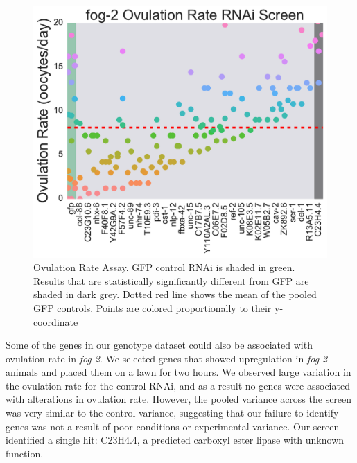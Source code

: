 \documentclass[10pt,letterpaper,twocolumn]{article}
\newcommand{\fog}{\emph{fog-2}}
\begin{document}
\begin{figure}
\renewcommand{\familydefault}{\sfdefault}\normalfont{}
\centering
\includegraphics[width=\linewidth]{../output/figs/final_figs/oocyte_rate_assay.pdf}
\caption{Ovulation Rate Assay. GFP control RNAi is shaded in green. Results that are statistically significantly different from GFP are shaded in dark grey. Dotted red line shows the mean of the pooled GFP controls. Points are colored proportionally to their y-coordinate
}%
\label{fig:oocytedropping}
\end{figure}

Some of the genes in our genotype dataset could also be associated with ovulation rate in \fog{}. We selected genes that showed upregulation in \fog{} animals and placed them on a lawn for two hours. We observed large variation in the ovulation rate for the control RNAi, and as a result no genes were associated with alterations in ovulation rate. However, the pooled variance across the screen was very similar to the control variance, suggesting that our failure to identify genes was not a result of poor conditions or experimental variance. Our screen identified a single hit: C23H4.4, a predicted carboxyl ester lipase with unknown function.
\end{document}
